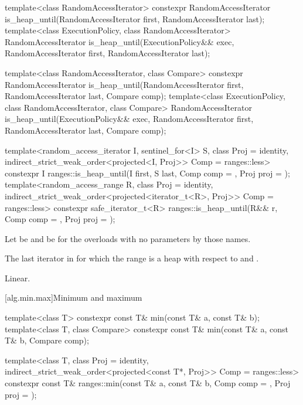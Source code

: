 %
\begin{itemdecl}
template<class RandomAccessIterator>
  constexpr RandomAccessIterator
    is_heap_until(RandomAccessIterator first, RandomAccessIterator last);
template<class ExecutionPolicy, class RandomAccessIterator>
  RandomAccessIterator
    is_heap_until(ExecutionPolicy&& exec,
                  RandomAccessIterator first, RandomAccessIterator last);

template<class RandomAccessIterator, class Compare>
  constexpr RandomAccessIterator
    is_heap_until(RandomAccessIterator first, RandomAccessIterator last,
                  Compare comp);
template<class ExecutionPolicy, class RandomAccessIterator, class Compare>
  RandomAccessIterator
    is_heap_until(ExecutionPolicy&& exec,
                  RandomAccessIterator first, RandomAccessIterator last,
                  Compare comp);

template<random_access_iterator I, sentinel_for<I> S, class Proj = identity,
         indirect_strict_weak_order<projected<I, Proj>> Comp = ranges::less>
  constexpr I ranges::is_heap_until(I first, S last, Comp comp = {}, Proj proj = {});
template<random_access_range R, class Proj = identity,
         indirect_strict_weak_order<projected<iterator_t<R>, Proj>> Comp = ranges::less>
  constexpr safe_iterator_t<R>
    ranges::is_heap_until(R&& r, Comp comp = {}, Proj proj = {});
\end{itemdecl}

\begin{itemdescr}
\pnum
Let  be 
and  be 
for the overloads with no parameters by those names.

\pnum
\returns
The last iterator  in 
for which the range 
is a heap with respect to  and .

\pnum
\complexity
Linear.
\end{itemdescr}


[alg.min.max]{Minimum and maximum}

%
\begin{itemdecl}
template<class T>
  constexpr const T& min(const T& a, const T& b);
template<class T, class Compare>
  constexpr const T& min(const T& a, const T& b, Compare comp);

template<class T, class Proj = identity,
         indirect_strict_weak_order<projected<const T*, Proj>> Comp = ranges::less>
  constexpr const T& ranges::min(const T& a, const T& b, Comp comp = {}, Proj proj = {});
\end{itemdecl}

